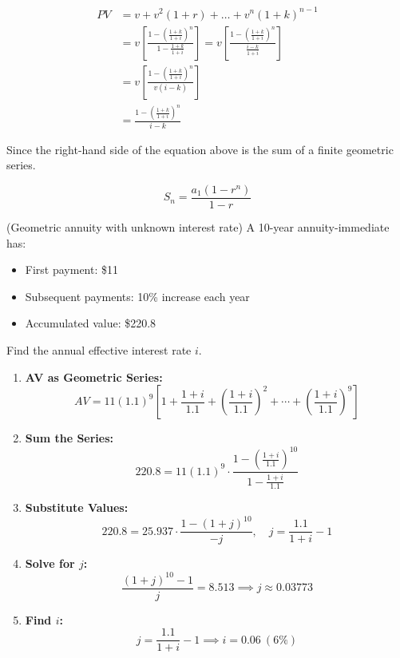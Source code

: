 \begin{align*}
    PV &= v + v^2 (1 + r) + \dots + v^n (1 + k)^{n-1} \\
   & = v \left[ \frac{1 - \left( \frac{1 + k}{1 + i} \right)^n}{1 - \frac{1 + k}{1 + i}} \right]  = v \left[ \frac{1 - \left( \frac{1 + k}{1 + i} \right)^n}{\frac{i - k}{1 + i}} \right] \\
    &= v \left[ \frac{1 - \left( \frac{1 + k}{1 + i} \right)^n}{v(i - k)} \right] \\
    &=\frac{1 - \left( \frac{1 + k}{1 + i} \right)^n}{i - k}
\end{align*}


\begin{comments}
    Since the right-hand side of the equation above is the sum of a finite geometric series. 
\end{comments}

\[
S_n = \frac{a_1 (1 - r^n)}{1 - r}
\]

\begin{example}(Geometric annuity with unknown interest rate)
    A 10-year annuity-immediate has:
\begin{itemize}
    \item First payment: \$11
    \item Subsequent payments: 10\% increase each year
    \item Accumulated value: \$220.8
\end{itemize}
Find the annual effective interest rate $i$.
\begin{enumerate}
    \item \textbf{AV as Geometric Series:}
    \[
    AV = 11(1.1)^9 \left[1 + \frac{1+i}{1.1} + \left(\frac{1+i}{1.1}\right)^2 + \cdots + \left(\frac{1+i}{1.1}\right)^9 \right]
    \]
    
    \item \textbf{Sum the Series:}
    \[
    220.8 = 11(1.1)^9 \cdot \frac{1 - \left(\frac{1+i}{1.1}\right)^{10}}{1 - \frac{1+i}{1.1}}
    \]
    
    \item \textbf{Substitute Values:}
    \[
    220.8 = 25.937 \cdot \frac{1 - (1 + j)^{10}}{-j}, \quad j = \frac{1.1}{1+i} - 1
    \]
    
    \item \textbf{Solve for $j$:}
    \[
    \frac{(1 + j)^{10} - 1}{j} = 8.513 \implies j \approx 0.03773
    \]
    
    \item \textbf{Find $i$:}
    \[
    j = \frac{1.1}{1+i} - 1 \implies i = \boxed{0.06} \ (6\%)
    \]
\end{enumerate}
\end{example}


